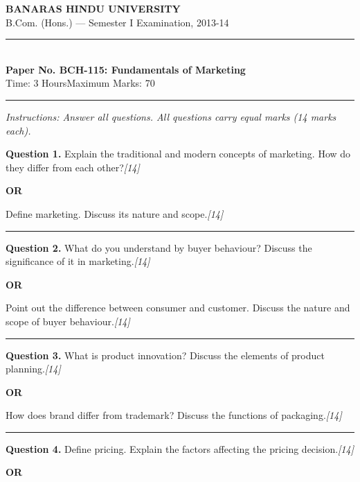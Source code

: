 \documentclass[11pt,a4paper]{article}
\newcommand{\pts}[1]{\hfill   \textit{[#1]}}
\begin{document}
\begin{center}
  {\large\bfseries BANARAS HINDU UNIVERSITY}\\[2pt]
  {\normalsize B.Com. (Hons.) --- Semester I Examination, 2013-14}\\[6pt]
  \rule{0.8\linewidth}{0.5pt}\\[6pt]
  {\large\bfseries Paper No. BCH-115: Fundamentals of Marketing}\\[4pt]
  {\normalsize Time: 3 Hours\hfill Maximum Marks: 70}
\end{center}

\rule{\linewidth}{0.4pt}

\smallskip



\noindent   \textit{Instructions: Answer all questions. All questions carry equal marks (14 marks each).}

\bigskip




\noindent   \textbf{Question 1.}
Explain the traditional and modern concepts of marketing. How do they differ from each other?\pts{14}

\centerline{   \textbf{OR}}

Define marketing. Discuss its nature and scope.\pts{14}

\medskip\rule{\linewidth}{0.2pt}




\noindent   \textbf{Question 2.}
What do you understand by buyer behaviour? Discuss the significance of it in marketing.\pts{14}

\centerline{   \textbf{OR}}

Point out the difference between consumer and customer. Discuss the nature and scope of buyer behaviour.\pts{14}

\medskip\rule{\linewidth}{0.2pt}




\noindent   \textbf{Question 3.}
What is product innovation? Discuss the elements of product planning.\pts{14}

\centerline{   \textbf{OR}}

How does brand differ from trademark? Discuss the functions of packaging.\pts{14}

\medskip\rule{\linewidth}{0.2pt}




\noindent   \textbf{Question 4.}
Define pricing. Explain the factors affecting the pricing decision.\pts{14}

\centerline{   \textbf{OR}}
\end{document}
